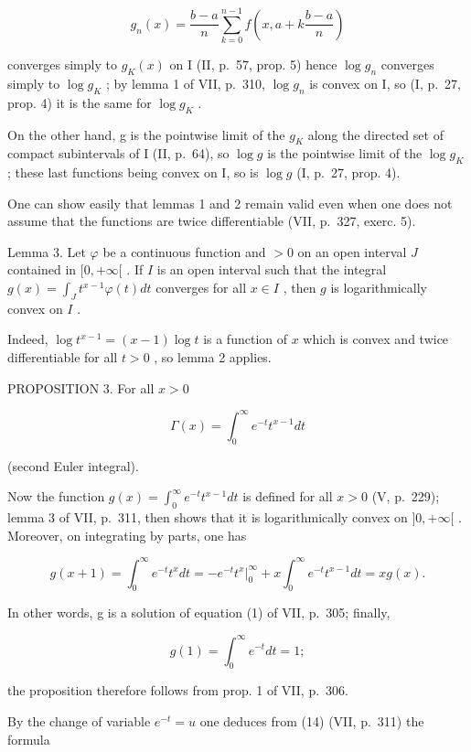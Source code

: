 \[
g _ {n} (x) = \frac {b - a}{n} \sum_ {k = 0} ^ {n - 1} f \left(x, a + k \frac {b - a}{n}\right)
\]

converges simply to \(g_{K}(x)\) on I (II, p.~57, prop. 5) hence \(\log g_{n}\) converges simply to \(\log g_{K}\) ; by lemma 1 of VII, p.~310, \(\log g_{n}\) is convex on I, so (I, p.~27, prop. 4) it is the same for \(\log g_{K}\) .

On the other hand, g is the pointwise limit of the \(g_{K}\) along the directed set of compact subintervals of I (II, p.~64), so \(\log g\) is the pointwise limit of the \(\log g_{K}\) ; these last functions being convex on I, so is \(\log g\) (I, p.~27, prop. 4).

One can show easily that lemmas 1 and 2 remain valid even when one does not assume that the functions are twice differentiable (VII, p.~327, exerc. 5).

Lemma 3. Let \(\varphi\) be a continuous function and \(>0\) on an open interval \(J\) contained in \([0, +\infty[\) . If \(I\) is an open interval such that the integral \(g(x) = \int_{J} t^{x-1} \varphi(t) dt\) converges for all \(x \in I\) , then \(g\) is logarithmically convex on \(I\) .

Indeed, \(\log t^{x - 1} = (x - 1)\log t\) is a function of \(x\) which is convex and twice differentiable for all \(t > 0\) , so lemma 2 applies.

PROPOSITION 3. For all \(x > 0\)

\[
\Gamma (x) = \int_ {0} ^ {\infty} e ^ {- t} t ^ {x - 1} d t\tag{14}
\]

(second Euler integral).

Now the function \(g(x) = \int_0^\infty e^{-t} t^{x-1} dt\) is defined for all \(x > 0\) (V, p.~229); lemma 3 of VII, p.~311, then shows that it is logarithmically convex on \(]0, +\infty[\) . Moreover, on integrating by parts, one has

\[
g (x + 1) = \int_ {0} ^ {\infty} e ^ {- t} t ^ {x} d t = - e ^ {- t} t ^ {x} \Big | _ {0} ^ {\infty} + x \int_ {0} ^ {\infty} e ^ {- t} t ^ {x - 1} d t = x g (x).
\]

In other words, g is a solution of equation (1) of VII, p.~305; finally,

\[
g (1) = \int_ {0} ^ {\infty} e ^ {- t} d t = 1;
\]

the proposition therefore follows from prop. 1 of VII, p.~306.

By the change of variable \(e^{-t}=u\) one deduces from (14) (VII, p.~311) the formula

